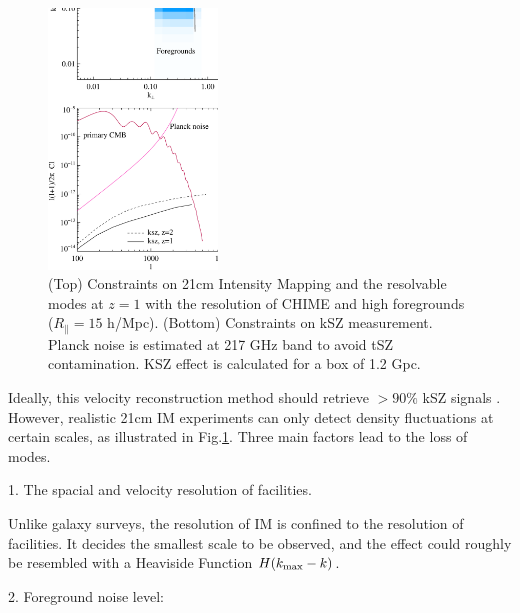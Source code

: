 \begin{figure}[tbp]
\centering
\includegraphics[width=0.4\textwidth]{figure/cmb_21cm.eps}
\vspace{-0.3cm}
\caption{
    (Top) Constraints on  
    21cm Intensity Mapping and the resolvable modes at $z=1$  
    with the resolution of CHIME and high foregrounds ($R_\parallel=15$ h/Mpc). 
    (Bottom) Constraints on kSZ measurement. Planck noise is estimated at 217 GHz band to avoid tSZ contamination. KSZ effect is calculated for a box of 1.2 Gpc.
}
\label{fig:cmb_21cm}
\end{figure}

Ideally, this velocity reconstruction method should 
retrieve $>90\%$ kSZ signals \cite{Shao11}. 
However, realistic 21cm IM experiments 
can only detect density fluctuations at certain scales, 
as illustrated in Fig.\ref{fig:cmb_21cm}. 
Three main factors lead to the loss of modes. 

1. The spacial and velocity resolution of facilities. 

Unlike galaxy surveys, the resolution of IM is confined to 
the resolution of facilities. 
It decides the smallest scale to be observed, 
and the effect could roughly be resembled with a Heaviside Function 
$H(k_\mathrm{max}-k)$. 

2. Foreground noise level:

